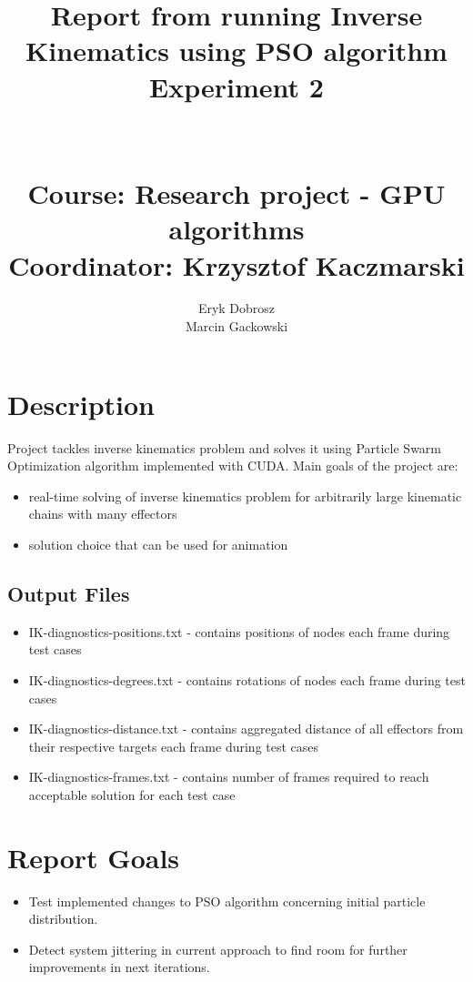 \documentclass[]{report}
\begin{document}
\title{Report from running Inverse Kinematics using PSO algorithm \\
\large Experiment 2 \\~\\~\\
\large Course: Research project - GPU algorithms \\
\large Coordinator: Krzysztof Kaczmarski }
\author{Eryk Dobrosz \\
	Marcin Gackowski}

{\let\newpage\relax\maketitle}

\chapter*{Description}
Project tackles inverse kinematics problem and solves it using Particle Swarm Optimization algorithm implemented with CUDA. Main goals of the project are:

\begin{itemize}
	\item real-time solving of inverse kinematics problem for arbitrarily large kinematic chains with many effectors
	\item solution choice that can be used for animation
\end{itemize}

\section*{Output Files}
\begin{itemize}
\item IK-diagnostics-positions.txt - contains positions of nodes each frame during test cases
\item IK-diagnostics-degrees.txt - contains rotations of nodes each frame during test cases
\item IK-diagnostics-distance.txt - contains aggregated distance of all effectors from their respective targets each frame during test cases
\item IK-diagnostics-frames.txt - contains number of frames required to reach acceptable solution for each test case
\end{itemize}

\chapter*{Report Goals}
\begin{itemize}
	\item Test implemented changes to PSO algorithm concerning initial particle distribution.
	\item Detect system jittering in current approach to find room for further improvements in next iterations.
\end{itemize}
\end{document}
